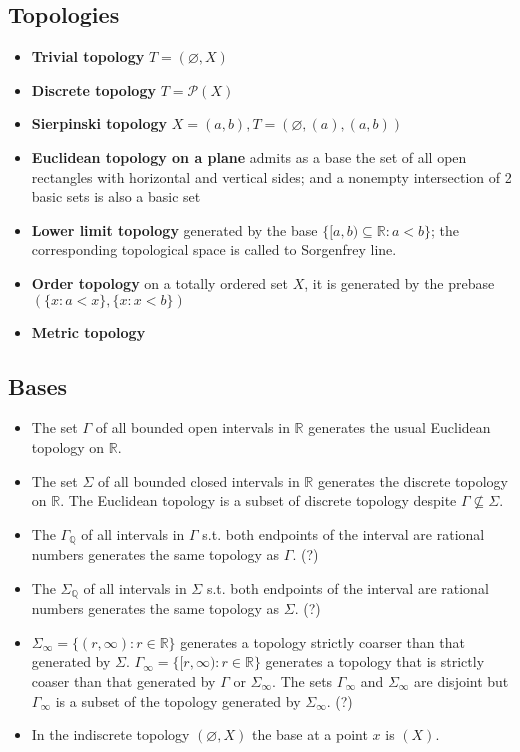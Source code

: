 \documentclass{article}
\begin{document}
\subsection{Topologies}
\begin{itemize}
\item \textbf{Trivial topology} \(T=(\varnothing, X)\)
\item \textbf{Discrete topology} \(T=\mathcal{P}(X)\)
\item \textbf{Sierpinski topology} \(X=(a,b), T=(\varnothing,(a),(a,b))\)
\item \textbf{Euclidean topology on a plane} admits as a base the set of all open rectangles with horizontal and vertical sides; and a nonempty intersection of 2 basic sets is also a basic set
\item \textbf{Lower limit topology} generated by the base \(\{[a,b)\subseteq\mathbb{R}:a<b\}\); the corresponding topological space is called to Sorgenfrey line.
\item \textbf{Order topology} on a totally ordered set \(X\), it is generated by the prebase \((\{x:a<x\},\{x:x<b\})\)
\item \textbf{Metric topology} 
\end{itemize}
\subsection{Bases}
\begin{itemize}
\item The set \(\Gamma\) of all bounded open intervals in \(\mathbb{R}\) generates the usual Euclidean  topology on \(\mathbb{R}\).
\item The set \(\Sigma\) of all bounded closed intervals in \(\mathbb{R}\) generates the discrete topology on \(\mathbb{R}\). 
    The Euclidean topology is a subset of discrete topology despite \(\Gamma\not\subseteq\Sigma\).
\item The \(\Gamma_{\mathbb{Q}}\) of all intervals in \(\Gamma\) s.t. both endpoints of the interval are rational numbers generates the same topology as \(\Gamma\). \color{red}(?)\color{black}
\item The \(\Sigma_{\mathbb{Q}}\) of all intervals in \(\Sigma\) s.t. both endpoints of the interval are rational numbers generates the same topology as \(\Sigma\). \color{red}(?)\color{black}
\item \(\Sigma_{\infty}=\{(r,\infty):r\in\mathbb{R}\}\) generates a topology strictly coarser than that generated by \(\Sigma\). \(\Gamma_{\infty}=\{[r,\infty):r\in\mathbb{R}\}\) generates a topology that is strictly coaser than that generated by \(\Gamma\) or \(\Sigma_{\infty}\).
    The sets \(\Gamma_{\infty}\) and \(\Sigma_{\infty}\) are disjoint but \(\Gamma_{\infty}\) is a subset of the topology generated by \(\Sigma_{\infty}\). \color{red}(?)\color{black}
\item In the indiscrete topology \((\varnothing, X)\) the base at a point \(x\) is \((X)\).
\end{itemize}
\end{document}
